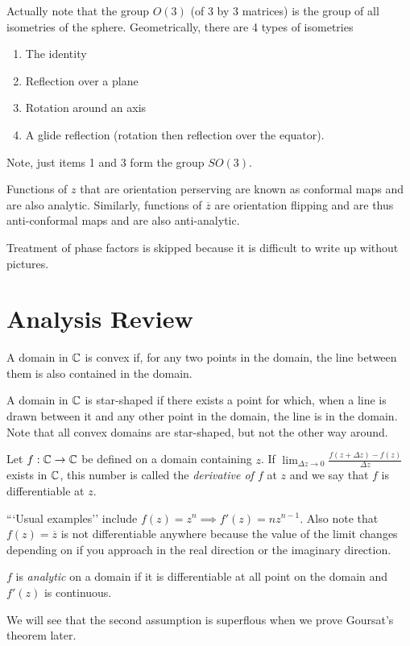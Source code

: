 \documentclass[11pt,leqno,oneside]{amsart}
\begin{document}
Actually note that the group $O(3)$ (of 3 by 3 matrices) is the group of all
isometries of the sphere. Geometrically, there are 4 types of isometries
\begin{enumerate}
    \item The identity
    \item Reflection over a plane
    \item Rotation around an axis
    \item A glide reflection (rotation then reflection over the equator).
\end{enumerate}
Note, just items 1 and 3 form the group $SO(3)$.

\begin{defn}
    Functions of $z$ that are orientation perserving are known as conformal
    maps and are also analytic. Similarly, functions of $\overline{z}$ are
    orientation flipping and are thus anti-conformal maps and are also
    anti-analytic.
\end{defn}

Treatment of phase factors is skipped because it is difficult to write up
without pictures.

\section*{Analysis Review}

\begin{defn}
A domain in ${\mathbb C}$ is convex if, for any two points in the domain, the line
between them is also contained in the domain.
\end{defn}
\begin{defn}
    A domain in ${\mathbb C}$ is star-shaped if there exists a point for which, when a
    line is drawn between it and any other point in the domain, the line is in
    the domain. Note that all convex domains are star-shaped, but not the other
    way around.
\end{defn}
\begin{defn}
    Let $f: {\mathbb C} \to {\mathbb C}$ be defined on a domain containing $z$. If $\lim_{\Delta
    z \to 0} \frac{f(z+\Delta z) - f(z)}{\Delta z}$ exists in ${\mathbb C}$, this number
    is called the \emph{derivative of $f$} at $z$ and we say that $f$ is
    differentiable at $z$.
\end{defn}

```Usual examples'' include $f(z) = z^n \implies f'(z) = nz^{n-1}$. Also note
that $f(z) = \overline{z}$ is not differentiable anywhere because the value of
the limit changes depending on if you approach in the real direction or the
imaginary direction.
\begin{defn}
    $f$ is \emph{analytic} on a domain if it is differentiable at all point on
    the domain and $f'(z)$ is continuous.
\end{defn}
We will see that the second assumption is superflous when we prove Goursat's
theorem later.
\end{document}
